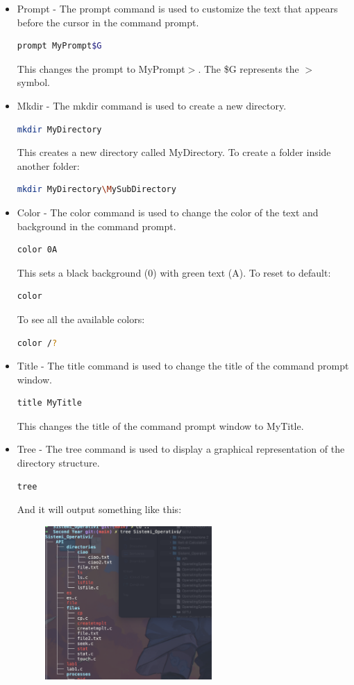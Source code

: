 \documentclass[a4paper]{article}
\begin{document}
\begin{itemize}
    \item Prompt - The prompt command is used to customize the text that appears before the cursor in the command prompt.
\begin{lstlisting}[language=bash]
prompt MyPrompt$G
\end{lstlisting}
This changes the prompt to MyPrompt$>$. The \$G represents the $>$ symbol.
\item Mkdir - The mkdir command is used to create a new directory.
\begin{lstlisting}[language=bash]
mkdir MyDirectory
\end{lstlisting}
This creates a new directory called MyDirectory. To create a folder inside another folder:
\begin{lstlisting}[language=bash]
mkdir MyDirectory\MySubDirectory
\end{lstlisting}
\item Color - The color command is used to change the color of the text and background in the command prompt.
\begin{lstlisting}[language=bash]
color 0A
\end{lstlisting}
This sets a black background (0) with green text (A).
To reset to default:
\begin{lstlisting}[language=bash]
color
\end{lstlisting}
To see all the available colors:
\begin{lstlisting}[language=bash]
color /?
\end{lstlisting}
\item Title - The title command is used to change the title of the command prompt window.
\begin{lstlisting}[language=bash]
title MyTitle
\end{lstlisting}
This changes the title of the command prompt window to MyTitle.
\item Tree - The tree command is used to display a graphical representation of the directory structure.
\begin{lstlisting}[language=bash]
tree
\end{lstlisting}
And it will output something like this:
\begin{figure}[H]
    \centering
    \includegraphics[width=0.6\textwidth]{treeEx.png}

\end{figure}
\end{itemize}
\end{document}
